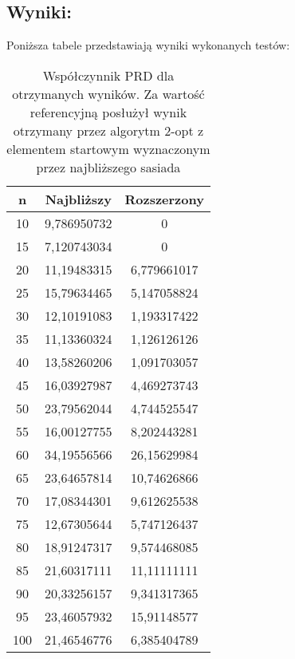   \subsection{Wyniki: }
    Poniższa tabele przedstawiają wyniki wykonanych testów:
    \begin{table}[H]
    \begin{tabular}{|c | c | c |} 
     \hline
     n & Najbliższy & Rozszerzony \\ [0.5ex] 
     \hline\hline
      10  & 9,786950732 &0 \\
      15  & 7,120743034 &0 \\
      20  & 11,19483315 &6,779661017 \\
      25  & 15,79634465 &5,147058824 \\
      30  & 12,10191083 &1,193317422 \\
      35  & 11,13360324 &1,126126126 \\
      40  & 13,58260206 &1,091703057 \\
      45  & 16,03927987 &4,469273743 \\
      50  & 23,79562044 &4,744525547 \\
      55  & 16,00127755 &8,202443281 \\
      60  & 34,19556566 &26,15629984 \\
      65  & 23,64657814 &10,74626866 \\
      70  & 17,08344301 &9,612625538 \\ 
      75  & 12,67305644 &5,747126437 \\
      80  & 18,91247317 &9,574468085 \\
      85  & 21,60317111 &11,11111111 \\
      90  & 20,33256157 &9,341317365 \\
      95  & 23,46057932 &15,91148577 \\
      100 & 21,46546776 &6,385404789 \\
     \hline
    \end{tabular}
    \caption{Współczynnik PRD dla otrzymanych wyników. Za wartość referencyjną posłużył wynik otrzymany przez algorytm 2-opt z elementem startowym wyznaczonym przez najbliższego sasiada}
    \end{table}

